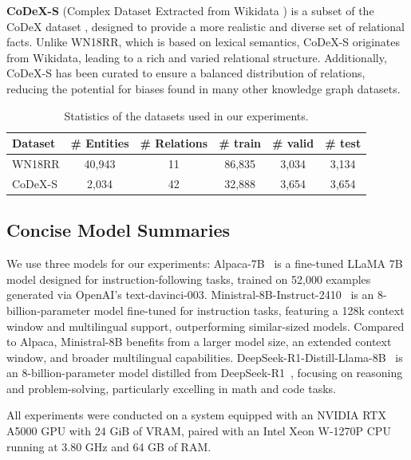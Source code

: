 \documentclass[12pt,a4paper]{article}
\begin{document}
\textbf{CoDeX-S} (Complex Dataset Extracted from Wikidata \cite{wikidata}) is a subset of the CoDeX dataset \cite{codex}, designed to provide a more realistic and diverse set of relational facts. Unlike WN18RR, which is based on lexical semantics, CoDeX-S originates from Wikidata, leading to a rich and varied relational structure. Additionally, CoDeX-S has been curated to ensure a balanced distribution of relations, reducing the potential for biases found in many other knowledge graph datasets.

\begin{table}[h]
    \centering
    \begin{tabular}{l c c c c c}
        \hline
        \textbf{Dataset} & \textbf{\# Entities} & \textbf{\# Relations} & \textbf{\# train} & \textbf{\# valid} & \textbf{\# test} \\
        \hline
        WN18RR           & 40,943          & 11              & 86,835            & 3,034             & 3,134            \\
        CoDeX-S          & 2,034           & 42              & 32,888            & 3,654             & 3,654            \\
        \hline
    \end{tabular}
    \caption{Statistics of the datasets used in our experiments.}
    \label{tab:datasets}
\end{table}


\subsection{Concise Model Summaries}

We use three models for our experiments:
Alpaca-7B~\cite{taori2023stanford} is a fine-tuned LLaMA 7B model designed for instruction-following tasks, trained on 52,000 examples generated via OpenAI's text-davinci-003.
Ministral-8B-Instruct-2410~\cite{mistralai2024ministral8b} is an 8-billion-parameter model fine-tuned for instruction tasks, featuring a 128k context window and multilingual support, outperforming similar-sized models.
Compared to Alpaca, Ministral-8B benefits from a larger model size, an extended context window, and broader multilingual capabilities.
DeepSeek-R1-Distill-Llama-8B~\cite{deepseekai2025deepseekr1distillllama8b} is an 8-billion-parameter model distilled from DeepSeek-R1~\cite{guo2025deepseek}, focusing on reasoning and problem-solving, particularly excelling in math and code tasks.

All experiments were conducted on a system equipped with an NVIDIA RTX A5000 GPU with 24 GiB of VRAM, paired with an Intel Xeon W-1270P CPU running at 3.80 GHz and 64 GB of RAM.
\end{document}
